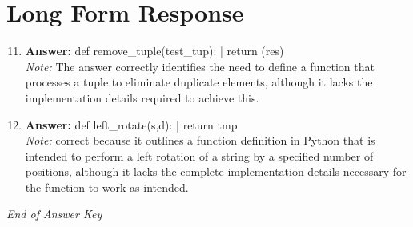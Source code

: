 \documentclass[12pt]{article}
\begin{document}
\section*{Long Form Response}
\begin{enumerate}[label=\arabic*.]
\setcounter{enumi}{10}
\item \textbf{Answer:} def remove\_tuple(test\_tup): | return (res)
\\ \textit{Note:} The answer correctly identifies the need to define a function that processes a tuple to eliminate duplicate elements, although it lacks the implementation details required to achieve this.
\item \textbf{Answer:} def left\_rotate(s,d): | return tmp
\\ \textit{Note:} correct because it outlines a function definition in Python that is intended to perform a left rotation of a string by a specified number of positions, although it lacks the complete implementation details necessary for the function to work as intended.
\end{enumerate}

\vfill
\noindent\textit{End of Answer Key}
\end{document}
